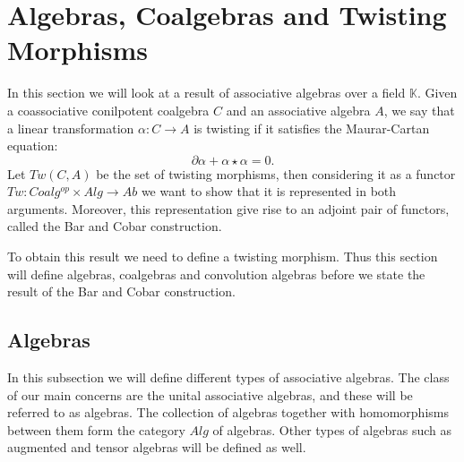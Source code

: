\documentclass[../../thesis.tex]{subfiles}
\begin{document}
    \section{Algebras, Coalgebras and Twisting Morphisms}

        In this section we will look at a result of associative algebras over a field $\mathbb{K}$. Given a coassociative conilpotent coalgebra $C$ and an associative algebra $A$, we say that a linear transformation $\alpha: C\rightarrow A$ is twisting if it satisfies the Maurar-Cartan equation:
            \begin{equation*}
                \partial\alpha + \alpha\star\alpha = 0.
            \end{equation*}
        Let $Tw(C,A)$ be the set of twisting morphisms, then considering it as a functor $Tw : Coalg^{op}\times Alg \rightarrow Ab$ we want to show that it is represented in both arguments. Moreover, this representation give rise to an adjoint pair of functors, called the Bar and Cobar construction.

            \begin{center}
            \end{center}

        To obtain this result we need to define a twisting morphism. Thus this section will define algebras, coalgebras and convolution algebras before we state the result of the Bar and Cobar construction.

        \subsection{Algebras}

            In this subsection we will define different types of associative algebras. The class of our main concerns are the unital associative algebras, and these will be referred to as algebras. The collection of algebras together with homomorphisms between them form the category $Alg$ of algebras. Other types of algebras such as augmented and tensor algebras will be defined as well.
\end{document}
